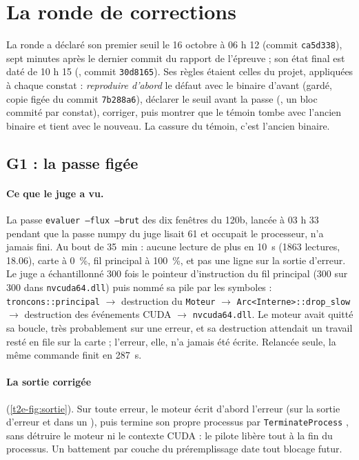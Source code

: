 \section{La ronde de corrections}\label{t2e-sec:ronde}

La ronde a déclaré son premier seuil le 16 octobre à 06 h 12 (commit \texttt{ca5d338}), sept minutes après le dernier commit du rapport de l'épreuve ; son état final est daté de 10 h 15 (, commit \texttt{30d8165}). Ses règles étaient celles du projet, appliquées à chaque constat : \emph{reproduire d'abord} le défaut avec le binaire d'avant (gardé, copie figée du commit \texttt{7b288a6}), déclarer le seuil avant la passe (, un bloc commité par constat), corriger, puis montrer que le témoin tombe avec l'ancien binaire et tient avec le nouveau. La cassure du témoin, c'est l'ancien binaire.

\subsection{G1 : la passe figée}\label{t2e-sec:g1}

\paragraph{Ce que le juge a vu.} La passe \texttt{evaluer --flux --brut} des dix fenêtres du 120b, lancée à 03 h 33 pendant que la passe numpy du juge lisait \SI{61}{\Go} et occupait le processeur, n'a jamais fini. Au bout de \SI{35}{\minute} : aucune lecture de plus en \SI{10}{\second} (\num{1863} lectures, \SI{18.06}{\Go}), carte à \SI{0}{\percent}, fil principal à \SI{100}{\percent}, et pas une ligne sur la sortie d'erreur. Le juge a échantillonné 300 fois le pointeur d'instruction du fil principal (300 sur 300 dans \texttt{nvcuda64.dll}) puis nommé sa pile par les symboles : \texttt{troncons::principal} $\to$ destruction du \texttt{Moteur} $\to$ \texttt{Arc<Interne>::drop\_slow} $\to$ destruction des événements CUDA $\to$ \texttt{nvcuda64.dll}. Le moteur avait quitté sa boucle, très probablement sur une erreur, et sa destruction attendait un travail resté en file sur la carte ; l'erreur, elle, n'a jamais été écrite. Relancée seule, la même commande finit en \SI{287}{\second}.

\paragraph{La sortie corrigée} (\cref{t2e-fig:sortie}). Sur toute erreur, le moteur écrit d'abord l'erreur (sur la sortie d'erreur et dans un ), puis termine son propre processus par \texttt{TerminateProcess} \cite{ms-terminateprocess}, sans détruire le moteur ni le contexte CUDA : le pilote libère tout à la fin du processus. Un battement par couche du préremplissage date tout blocage futur.

